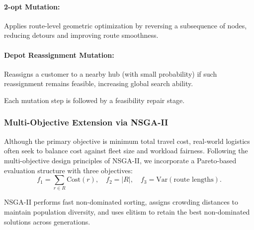 \documentclass[conference]{IEEEtran}
\begin{document}
\paragraph{2-opt Mutation:}
Applies route-level geometric optimization by reversing a subsequence of nodes, reducing detours and improving route smoothness.

\paragraph{Depot Reassignment Mutation:}
Reassigns a customer to a nearby hub (with small probability) if such reassignment remains feasible, increasing global search ability.

Each mutation step is followed by a feasibility repair stage.

\subsubsection{Multi-Objective Extension via NSGA-II}

Although the primary objective is minimum total travel cost, real-world logistics often seek to balance cost against fleet size and workload fairness. Following the multi-objective design principles of NSGA-II, we incorporate a Pareto-based evaluation structure with three objectives:
\[
f_1 = \sum_{r \in R} \text{Cost}(r), \quad
f_2 = |R|, \quad
f_3 = \mathrm{Var}(\text{route lengths}).
\]

NSGA-II performs fast non-dominated sorting, assigns crowding distances to maintain population diversity, and uses elitism to retain the best non-dominated solutions across generations.
\end{document}
